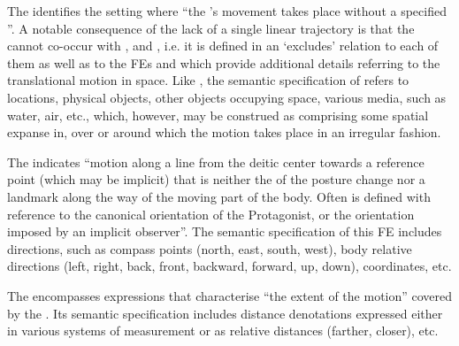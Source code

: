 \documentclass[output=paper,colorlinks,citecolor=brown]{langscibook}
\begin{document}


The  identifies the setting where ``the 's movement takes place without a specified ''. A notable consequence of the lack of a single linear trajectory is that the  cannot co-occur with ,  and , i.e. it is defined in an ‘excludes’ relation to each of them as well as to the FEs  and  which provide additional details referring to the translational motion in space. 
Like , the semantic specification of  refers to locations, physical objects, other objects occupying space, various media, such as water, air, etc., which, however, may be construed as comprising some spatial expanse in, over or around which the motion takes place in an irregular fashion.

The  %
indicates ``motion along a line from the deitic center towards a reference point (which may be implicit) that is neither the  of the posture change nor a landmark along the way of the moving part of the body. Often  is defined with reference to the canonical orientation of the Protagonist, or the orientation imposed by an implicit observer''. %
The semantic specification of this FE includes directions, such as compass points (north, east, south, west), body relative directions (left, right, back, front, backward, forward, up, down), coordinates, etc.

The  encompasses expressions that characterise ``the extent of the motion'' covered by the . Its semantic specification includes distance denotations expressed either in various systems of measurement or as relative distances (farther, closer), etc.  
\end{document}
